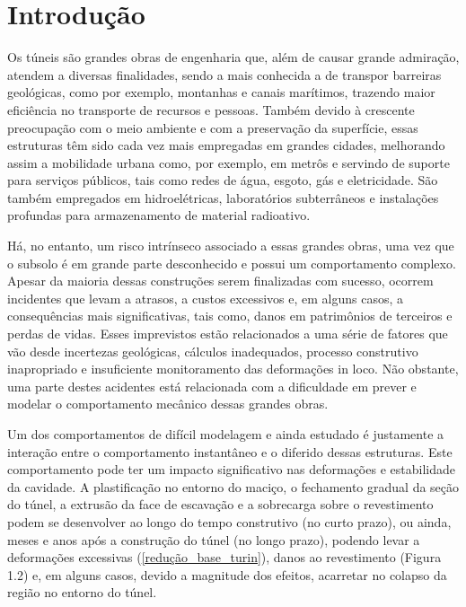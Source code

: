 \chapter{Introdução}\label{introducao}

Os túneis são grandes obras de engenharia que, além de causar grande admiração, atendem a diversas finalidades, sendo a mais conhecida a de transpor barreiras geológicas, como por exemplo, montanhas e canais marítimos, trazendo maior eficiência no transporte de recursos e pessoas. Também devido à crescente preocupação com o meio ambiente e com a preservação da superfície, essas estruturas têm sido cada vez mais empregadas em grandes cidades, melhorando assim a mobilidade urbana como, por exemplo, em metrôs e servindo de suporte para serviços públicos, tais como redes de água, esgoto, gás e eletricidade. São também empregados em hidroelétricas, laboratórios subterrâneos e instalações profundas para armazenamento de material radioativo.

Há, no entanto, um risco intrínseco associado a essas grandes obras, uma vez que o subsolo é em grande parte desconhecido e possui um comportamento complexo. Apesar da maioria dessas construções serem finalizadas com sucesso, ocorrem incidentes que levam a atrasos, a custos excessivos e, em alguns casos, a consequências mais significativas, tais como, danos em patrimônios de terceiros e perdas de vidas. Esses imprevistos estão relacionados a uma série de fatores que vão desde incertezas geológicas, cálculos inadequados, processo construtivo inapropriado e insuficiente monitoramento das deformações in loco. Não obstante, uma parte destes acidentes está relacionada com a dificuldade em prever e modelar o comportamento mecânico dessas grandes obras.

Um dos comportamentos de difícil modelagem e ainda estudado é justamente a interação entre o comportamento instantâneo e o diferido dessas estruturas. Este comportamento pode ter um impacto significativo nas deformações e estabilidade da cavidade. A plastificação no entorno do maciço, o fechamento gradual da seção do túnel, a extrusão da face de escavação e a sobrecarga sobre o revestimento podem se desenvolver ao longo do tempo construtivo (no curto prazo), ou ainda, meses e anos após a construção do túnel (no longo prazo), podendo levar a deformações excessivas (\autoref{redução_base_turin}), danos ao revestimento (Figura 1.2) e, em alguns casos, devido a magnitude dos efeitos, acarretar no colapso da região no entorno do túnel.

